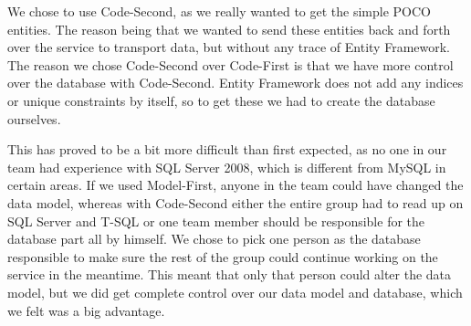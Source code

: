 We chose to use Code-Second, as we really wanted to get the simple POCO entities. The reason being that we wanted to send these entities back and forth over the service to transport data, but without any trace of Entity Framework. The reason we chose Code-Second over Code-First is that we have more control over the database with Code-Second. Entity Framework does not add any indices or unique constraints by itself, so to get these we had to create the database ourselves.

This has proved to be a bit more difficult than first expected, as no one in our team had experience with SQL Server 2008, which is different from MySQL in certain areas. If we used Model-First, anyone in the team could have changed the data model, whereas with Code-Second either the entire group had to read up on SQL Server and T-SQL or one team member should be responsible for the database part all by himself. We chose to pick one person as the database responsible to make sure the rest of the group could continue working on the service in the meantime. This meant that only that person could alter the data model, but we did get complete control over our data model and database, which we felt was a big advantage.